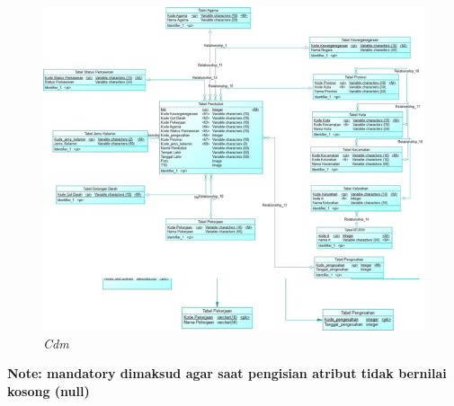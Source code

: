 \documentclass[12pt,a4paper,bahasa]{article}
\begin{document}
\begin{figure}[!htbp]
\centering
\includegraphics[scale=0.8]{gambar/Cdm.png}
\caption{\textit{Cdm}}
\label{Cdm}
\end{figure}
\textbf{Note: mandatory dimaksud agar saat pengisian atribut tidak bernilai kosong (null)}
\end{document}
